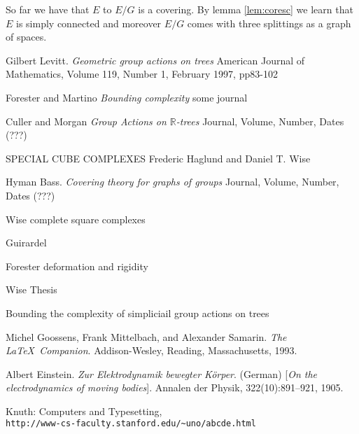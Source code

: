\documentclass[12pt,parskip=full]{report}
\theoremstyle{plain}
\theoremstyle{definition}
\begin{document}
So far we have that $E$ to $E/G$ is a covering. By lemma \ref{lem:coresc} we learn that \(E\) is simply connected and moreover \(E/G\) comes with three splittings as a graph of spaces.



\noindent

\cleardoublepage








\begin{thebibliography}{9}


Gilbert Levitt.
\textit{Geometric group actions on trees}
American Journal of Mathematics, Volume 119, Number 1, February 1997, pp83-102

Forester and Martino
\textit{Bounding complexity}
some journal

Culler and Morgan
\textit{Group Actions on $\mathbb{R}$-trees}
Journal, Volume, Number, Dates (???)

SPECIAL CUBE COMPLEXES
Frederic Haglund and Daniel T. Wise

Hyman Bass.
\textit{Covering theory for graphs of groups}
Journal, Volume, Number, Dates (???)


Wise complete square complexes

Guirardel

Forester deformation and rigidity

Wise Thesis

Bounding the complexity of simpliciail group actions
on trees 


Michel Goossens, Frank Mittelbach, and Alexander Samarin. 
\textit{The \LaTeX\ Companion}. 
Addison-Wesley, Reading, Massachusetts, 1993.

Albert Einstein. 
\textit{Zur Elektrodynamik bewegter K{\"o}rper}. (German) 
[\textit{On the electrodynamics of moving bodies}]. 
Annalen der Physik, 322(10):891–921, 1905.

Knuth: Computers and Typesetting,
\\\texttt{http://www-cs-faculty.stanford.edu/\~{}uno/abcde.html}

\end{thebibliography}



\end{document}
